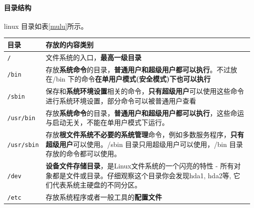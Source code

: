 \documentclass[UTF8,a4paper,12pt]{ctexbook}
\begin{document}
		\paragraph{目录结构}linux 目录如表\ref{mulu}所示。
			\begin{table}
				\caption{Linux 目录详解}
				\label{mulu}
				\begin{longtable}{l|m{14cm}}
					\hline
					目录 	   	   & 存放的内容类别\\
					\hline
							\verb|/ |   		&	文件系统的入口，\textbf{最高一级目录}			\\ 
							\verb|/bin| 		&	存放\textbf{系统命令}的目录，\textbf{普通用户和超级用户都可以执行}。不过放在/bin 下的命令\textbf{在单用户模式(安全模式)下也可以执行}\\
							\verb|/sbin|		&	保存和\textbf{系统环境设置}相关的命令，\textbf{只有超级用户}可以使用这些命令进行系统环境设置，部分命令可以被普通用户查看\\
							\verb|/usr/bin| 	&	存放\textbf{系统命令}的目录，\textbf{普通用户和超级用户都可以执行}，这些命运与启动无关，不能在单用户模式下运行。\\
							\verb|/usr/sbin|	&	存放\textbf{根文件系统不必要的系统管理}命令，例如多数服务程序，\textbf{只有超级用户}可以使用。/sbin 目录只用超级用户可以使用，/bin 目录存放的命令都可以使用。\\
		
							\verb|/dev|		&	\textbf{设备文件存储目录}，是Linux文件系统的一个闪亮的特性 - 所有对象都是文件或目录。仔细观察这个目录你会发现hda1, hda2等, 它们代表系统主硬盘的不同分区。			\\
							\verb|/etc|		&	存放系统程序或者一般工具的\textbf{配置文件}			\\
							

\end{longtable}
\end{table}
\end{document}
